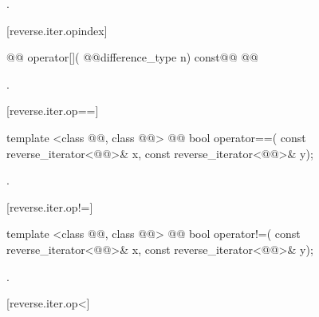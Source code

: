 \begin{itemdescr}
\pnum
\effects
{}

\pnum
\returns
{}.
\end{itemdescr}

[reverse.iter.opindex]{}

%
\begin{itemdecl}
@@ operator[](
  @@difference_type n) const@\removed{;}@
    @@
\end{itemdecl}

\begin{itemdescr}
\pnum
\returns
{}.
\end{itemdescr}

[reverse.iter.op==]{}

%
\begin{itemdecl}
template <class @@, class @@>
    @@
  bool operator==(
    const reverse_iterator<@@>& x,
    const reverse_iterator<@@>& y);
\end{itemdecl}

\begin{itemdescr}
\pnum
\removed{\returns}
.
\end{itemdescr}

[reverse.iter.op!=]{}

%
\begin{itemdecl}
template <class @@, class @@>
    @@
  bool operator!=(
    const reverse_iterator<@@>& x,
    const reverse_iterator<@@>& y);
\end{itemdecl}

\begin{itemdescr}
\pnum
\removed{\returns}
.
\end{itemdescr}

[reverse.iter.op<]{}

